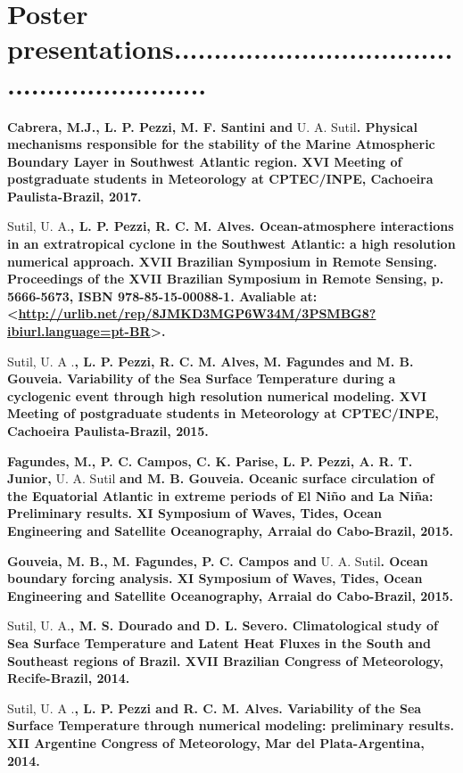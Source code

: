 \documentclass[letterpaper]{twentysecondcv} %
\begin{document}
\section{Poster presentations\textcolor{mainblue}{............................................................}}


\textbf{Cabrera, M.J., L. P. Pezzi, M. F. Santini and} U. A. Sutil\textbf{. Physical mechanisms responsible for the stability of the Marine Atmospheric Boundary Layer in Southwest Atlantic region. XVI Meeting of postgraduate students in Meteorology at CPTEC/INPE, Cachoeira Paulista-Brazil, 2017.}\

Sutil, U. A.\textbf{, L. P. Pezzi, R. C. M. Alves. Ocean-atmosphere interactions in an extratropical cyclone in the Southwest Atlantic: a high resolution numerical approach. XVII Brazilian Symposium in Remote Sensing. Proceedings of the XVII Brazilian Symposium in Remote Sensing, p. 5666-5673, ISBN 978-85-15-00088-1. Avaliable at:<\textcolor{mainblue}{\href{http://urlib.net/rep/8JMKD3MGP6W34M/3PSMBG8?ibiurl.language=pt-BR}{http://urlib.net/rep/8JMKD3MGP6W34M/3PSMBG8?ibiurl.language=pt-BR}}>.}

Sutil, U. A .\textbf{, L. P. Pezzi, R. C. M. Alves, M. Fagundes and M. B. Gouveia. Variability of the Sea Surface Temperature during a cyclogenic event through high resolution numerical modeling. XVI Meeting of postgraduate students in Meteorology at CPTEC/INPE, Cachoeira Paulista-Brazil, 2015.}

\textbf{Fagundes, M., P. C. Campos, C. K. Parise, L. P. Pezzi, A. R. T. Junior,} U. A. Sutil\textbf{ and M. B. Gouveia. Oceanic surface circulation of the Equatorial Atlantic in extreme periods of El Niño and La Niña: Preliminary results. XI Symposium of Waves, Tides, Ocean Engineering and Satellite Oceanography, Arraial do Cabo-Brazil, 2015.}

\textbf{Gouveia, M. B., M. Fagundes, P. C. Campos and} U. A. Sutil\textbf{. Ocean boundary forcing analysis. XI Symposium of Waves, Tides, Ocean Engineering and Satellite Oceanography, Arraial do Cabo-Brazil, 2015.}

Sutil, U. A.\textbf{, M. S. Dourado and D. L. Severo. Climatological study of Sea Surface Temperature and Latent Heat Fluxes in the South and Southeast regions of Brazil. XVII Brazilian Congress of Meteorology, Recife-Brazil, 2014.}

Sutil, U. A .\textbf{, L. P. Pezzi and R. C. M. Alves. Variability of the Sea Surface Temperature through numerical modeling: preliminary results. XII Argentine Congress of Meteorology, Mar del Plata-Argentina, 2014.}
\end{document}
